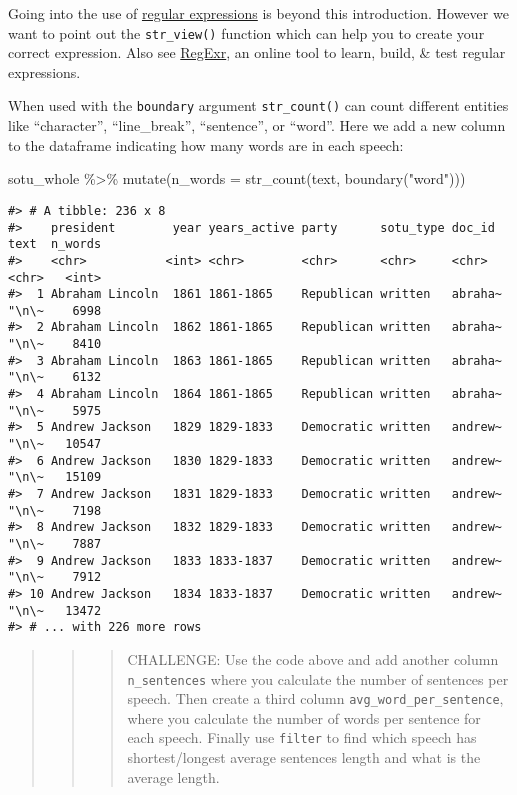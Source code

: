 \documentclass[
]{book}
\newenvironment{Shaded}{\begin{snugshade}}{\end{snugshade}}
\newcommand{\AttributeTok}[1]{\textcolor[rgb]{0.77,0.63,0.00}{#1}}
\newcommand{\FunctionTok}[1]{\textcolor[rgb]{0.00,0.00,0.00}{#1}}
\newcommand{\NormalTok}[1]{#1}
\newcommand{\SpecialCharTok}[1]{\textcolor[rgb]{0.00,0.00,0.00}{#1}}
\newcommand{\StringTok}[1]{\textcolor[rgb]{0.31,0.60,0.02}{#1}}
\begin{document}
Going into the use of \href{https://en.wikipedia.org/wiki/Regular_expression}{regular expressions} is beyond this introduction. However we want to point out the \texttt{str\_view()} function which can help you to create your correct expression. Also see \href{https://regexr.com/}{RegExr}, an online tool to learn, build, \& test regular expressions.

When used with the \texttt{boundary} argument \texttt{str\_count()} can count different entities like ``character'', ``line\_break'', ``sentence'', or ``word''. Here we add a new column to the dataframe indicating how many words are in each speech:

\begin{Shaded}
\begin{Highlighting}[]
\NormalTok{sotu\_whole }\SpecialCharTok{\%\textgreater{}\%} 
  \FunctionTok{mutate}\NormalTok{(}\AttributeTok{n\_words =} \FunctionTok{str\_count}\NormalTok{(text, }\FunctionTok{boundary}\NormalTok{(}\StringTok{"word"}\NormalTok{))) }
\end{Highlighting}
\end{Shaded}

\begin{verbatim}
#> # A tibble: 236 x 8
#>    president        year years_active party      sotu_type doc_id  text  n_words
#>    <chr>           <int> <chr>        <chr>      <chr>     <chr>   <chr>   <int>
#>  1 Abraham Lincoln  1861 1861-1865    Republican written   abraha~ "\n\~    6998
#>  2 Abraham Lincoln  1862 1861-1865    Republican written   abraha~ "\n\~    8410
#>  3 Abraham Lincoln  1863 1861-1865    Republican written   abraha~ "\n\~    6132
#>  4 Abraham Lincoln  1864 1861-1865    Republican written   abraha~ "\n\~    5975
#>  5 Andrew Jackson   1829 1829-1833    Democratic written   andrew~ "\n\~   10547
#>  6 Andrew Jackson   1830 1829-1833    Democratic written   andrew~ "\n\~   15109
#>  7 Andrew Jackson   1831 1829-1833    Democratic written   andrew~ "\n\~    7198
#>  8 Andrew Jackson   1832 1829-1833    Democratic written   andrew~ "\n\~    7887
#>  9 Andrew Jackson   1833 1833-1837    Democratic written   andrew~ "\n\~    7912
#> 10 Andrew Jackson   1834 1833-1837    Democratic written   andrew~ "\n\~   13472
#> # ... with 226 more rows
\end{verbatim}

\begin{quote}
\begin{quote}
\begin{quote}
CHALLENGE: Use the code above and add another column \texttt{n\_sentences} where you calculate the number of sentences per speech. Then create a third column \texttt{avg\_word\_per\_sentence}, where you calculate the number of words per sentence for each speech. Finally use \texttt{filter} to find which speech has shortest/longest average sentences length and what is the average length.
\end{quote}
\end{quote}
\end{quote}
\end{document}
